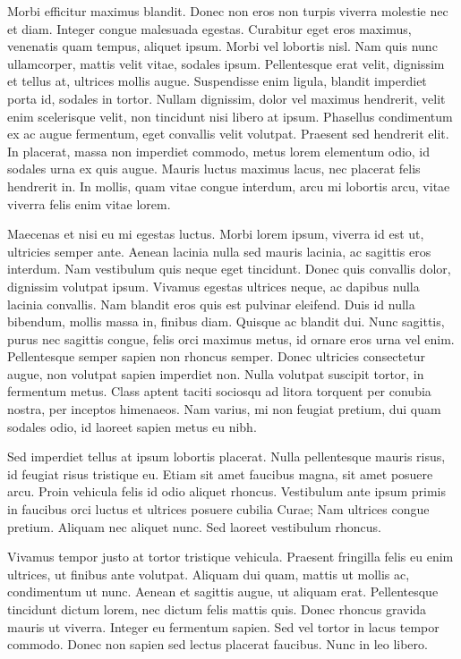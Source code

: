 \documentclass[pdftex, brazil, 12pt, twoside]{article}
\begin{document}
Morbi efficitur maximus blandit. Donec non eros non turpis viverra molestie nec et diam. Integer congue malesuada egestas. Curabitur eget eros maximus, venenatis quam tempus, aliquet ipsum. Morbi vel lobortis nisl. Nam quis nunc ullamcorper, mattis velit vitae, sodales ipsum. Pellentesque erat velit, dignissim et tellus at, ultrices mollis augue. Suspendisse enim ligula, blandit imperdiet porta id, sodales in tortor. Nullam dignissim, dolor vel maximus hendrerit, velit enim scelerisque velit, non tincidunt nisi libero at ipsum. Phasellus condimentum ex ac augue fermentum, eget convallis velit volutpat. Praesent sed hendrerit elit. In placerat, massa non imperdiet commodo, metus lorem elementum odio, id sodales urna ex quis augue. Mauris luctus maximus lacus, nec placerat felis hendrerit in. In mollis, quam vitae congue interdum, arcu mi lobortis arcu, vitae viverra felis enim vitae lorem.

Maecenas et nisi eu mi egestas luctus. Morbi lorem ipsum, viverra id est ut, ultricies semper ante. Aenean lacinia nulla sed mauris lacinia, ac sagittis eros interdum. Nam vestibulum quis neque eget tincidunt. Donec quis convallis dolor, dignissim volutpat ipsum. Vivamus egestas ultrices neque, ac dapibus nulla lacinia convallis. Nam blandit eros quis est pulvinar eleifend. Duis id nulla bibendum, mollis massa in, finibus diam. Quisque ac blandit dui. Nunc sagittis, purus nec sagittis congue, felis orci maximus metus, id ornare eros urna vel enim. Pellentesque semper sapien non rhoncus semper. Donec ultricies consectetur augue, non volutpat sapien imperdiet non. Nulla volutpat suscipit tortor, in fermentum metus. Class aptent taciti sociosqu ad litora torquent per conubia nostra, per inceptos himenaeos. Nam varius, mi non feugiat pretium, dui quam sodales odio, id laoreet sapien metus eu nibh.

Sed imperdiet tellus at ipsum lobortis placerat. Nulla pellentesque mauris risus, id feugiat risus tristique eu. Etiam sit amet faucibus magna, sit amet posuere arcu. Proin vehicula felis id odio aliquet rhoncus. Vestibulum ante ipsum primis in faucibus orci luctus et ultrices posuere cubilia Curae; Nam ultrices congue pretium. Aliquam nec aliquet nunc. Sed laoreet vestibulum rhoncus.

Vivamus tempor justo at tortor tristique vehicula. Praesent fringilla felis eu enim ultrices, ut finibus ante volutpat. Aliquam dui quam, mattis ut mollis ac, condimentum ut nunc. Aenean et sagittis augue, ut aliquam erat. Pellentesque tincidunt dictum lorem, nec dictum felis mattis quis. Donec rhoncus gravida mauris ut viverra. Integer eu fermentum sapien. Sed vel tortor in lacus tempor commodo. Donec non sapien sed lectus placerat faucibus. Nunc in leo libero.
\end{document}
